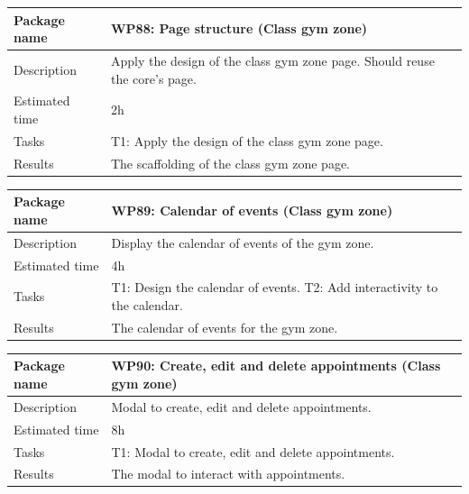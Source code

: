 \documentclass[a4paper, 12pt, oneside]{book}
\begin{document}
\vspace*{16pt}
\begin{tabularx}{\textwidth}{| l | X |}
	\hline
	\rowcolor{rowColor}
	{\semibf Package name}   & {\semibf WP88}: Page structure (Class gym zone)                            \\
	\hline
	{\semibf Description}    & Apply the design of the class gym zone page. Should reuse the core's page. \\
	\hline
	\rowcolor{rowColor}
	{\semibf Estimated time} & 2h                                                                         \\
	\hline
	{\semibf Tasks}          & {\semibf T1}: Apply the design of the class gym zone page.                 \\
	\hline
	\rowcolor{rowColor}
	{\semibf Results}        & The scaffolding of the class gym zone page.                                \\
	\hline
\end{tabularx}
\vspace*{16pt}
\begin{tabularx}{\textwidth}{| l | X |}
	\hline
	\rowcolor{rowColor}
	{\semibf Package name}   & {\semibf WP89}: Calendar of events (Class gym zone) \\
	\hline
	{\semibf Description}    & Display the calendar of events of the gym zone.     \\
	\hline
	\rowcolor{rowColor}
	{\semibf Estimated time} & 4h                                                  \\
	\hline
	{\semibf Tasks}          & {\semibf T1}: Design the calendar of events.
	{\semibf T2}: Add interactivity to the calendar.                               \\
	\hline
	\rowcolor{rowColor}
	{\semibf Results}        & The calendar of events for the gym zone.            \\
	\hline
\end{tabularx}
\vspace*{16pt}
\begin{tabularx}{\textwidth}{| l | X |}
	\hline
	\rowcolor{rowColor}
	{\semibf Package name}   & {\semibf WP90}: Create, edit and delete appointments (Class gym zone) \\
	\hline
	{\semibf Description}    & Modal to create, edit and delete appointments.                        \\
	\hline
	\rowcolor{rowColor}
	{\semibf Estimated time} & 8h                                                                    \\
	\hline
	{\semibf Tasks}          & {\semibf T1}: Modal to create, edit and delete appointments.          \\
	\hline
	\rowcolor{rowColor}
	{\semibf Results}        & The modal to interact with appointments.                              \\
	\hline
\end{tabularx}
\end{document}
